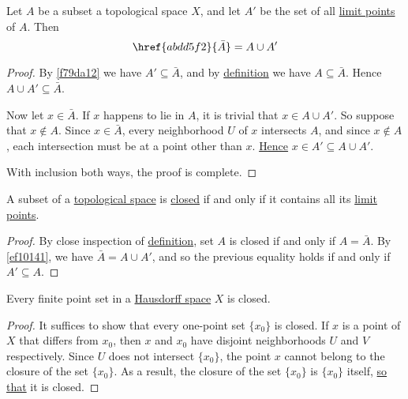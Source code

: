 \label{ef10141}

Let $A$ be a subset a topological space $X$, and let $A'$ be the set of all
\href{b0219cd}{limit points} of $A$. Then
$$
  \href{abdd5f2}{\bar A}=A\cup A'
$$

\begin{proof}
  By \autoref{f79da12} we have $A'\subseteq\bar A$, and by
  \href{abdd5f2}{definition} we have $A\subseteq\bar A$. Hence $A\cup
  A'\subseteq\bar A$.

  Now let $x\in\bar A$. If $x$ happens to lie in $A$, it is trivial that $x\in
  A\cup A'$. So suppose that $x\notin A$. Since $x\in\bar A$, every
  neighborhood $U$ of $x$ intersects $A$, and since $x\notin A$, each
  intersection must be at a point other than $x$. \href{b0219cd}{Hence} $x\in
  A'\subseteq A\cup A'$.

  With inclusion both ways, the proof is complete.
\end{proof}

\label{aeb48aa}

A subset of a \href{de3c1b1}{topological space} is \href{dd23fec}{closed} if
and only if it contains all its \href{b0219cd}{limit points}.

\begin{proof}
  By close inspection of \href{abdd5f2}{definition}, set $A$ is closed if and
  only if $A=\bar A$. By \autoref{ef10141}, we have $\bar A=A\cup A'$, and so
  the previous equality holds if and only if $A'\subseteq A$.
\end{proof}

\label{e76d337}

Every finite point set in a \href{e8a8d91}{Hausdorff space} $X$ is closed.

\begin{proof}
  \def\x{\{x_0\}}
  It suffices to show that every one-point set $\x$ is closed. If $x$ is a point
  of $X$ that differs from $x_0$, then $x$ and $x_0$ have disjoint neighborhoods
  $U$ and $V$ respectively. Since $U$ does not intersect $\x$, the point $x$
  cannot belong to the closure of the set $\x$. As a result, the closure of the
  set $\x$ is $\x$ itself, \href{abdd5f2}{so that} it is closed.
\end{proof}

\label{f3c1e40}

